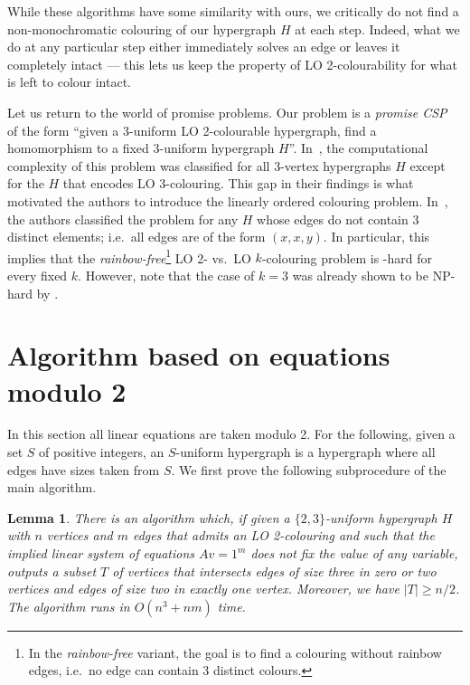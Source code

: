 \documentclass[a4paper,11pt]{article}
\theoremstyle{plain}
\newtheorem{lemma}[theorem]{Lemma}
\theoremstyle{definition}
\begin{document}
While these algorithms have some similarity with ours, we critically do not find a non-monochromatic colouring of our hypergraph $H$ at each step. Indeed, what we do at any particular step either immediately solves an edge or leaves it completely intact --- this lets us keep the property of LO 2-colourability for what is left to colour intact.

Let us return to the world of promise problems. Our problem is a \emph{promise CSP}~\cite{BBKO21} of the form ``given a 3-uniform LO 2-colourable hypergraph, find a homomorphism to a fixed 3-uniform hypergraph $H$''. 
%
In~\cite{Barto21:stacs}, the computational complexity of this problem was classified for all 3-vertex hypergraphs $H$ except for the $H$ that encodes LO 3-colouring. This gap in their findings is what motivated the authors to introduce the linearly ordered colouring problem. In~\cite{CKKNZ25:TOCL}, the authors classified the problem for any $H$ whose edges do not contain 3 distinct elements; i.e.~all edges are of the form $(x, x, y)$. In particular, this implies that the \emph{rainbow-free}\footnote{In the \emph{rainbow-free} variant, the goal is to find a colouring without rainbow edges, i.e.~no edge can contain 3 distinct colours.} LO 2- vs.~LO $k$-colouring problem is \NP-hard for every fixed $k$. However, note that the case of $k=3$ was already shown to be NP-hard by \cite{Barto21:stacs}. 

\section{Algorithm based on equations modulo 2}\label{sec:algomod2}

In this section all linear equations are taken modulo 2. For the following, given a set $S$ of positive integers, an $S$-uniform hypergraph is a hypergraph where all edges have sizes taken from $S$. We first prove the following subprocedure of the main algorithm.

\begin{lemma}\label{lem:innerstep}
    There is an algorithm which, if given a $\{2, 3\}$-uniform hypergraph $H$ with $n$ vertices and
    $m$ edges that admits an LO 2-colouring and such that the implied linear
    system of equations $Av=1^m$ does not fix the value of any variable, outputs a subset $T$ of vertices that intersects edges of size three in zero or two vertices and edges of size two in exactly one vertex.
    Moreover, we have  $\vert T\vert \geq n / 2$. The algorithm runs in $O(n^3 + nm)$ time.
\end{lemma}
\end{document}
